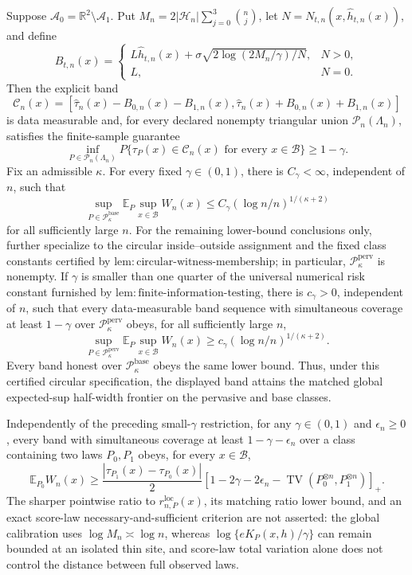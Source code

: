 Suppose \(\mathcal A_0=\mathbb R^2\setminus\mathcal A_1\). Put \(M_n=2|\mathcal H_n|\sum_{j=0}^3\binom nj\), let \(N=N_{t,n}(x,\widehat h_{t,n}(x))\), and define
\[
 B_{t,n}(x)=
 \begin{cases}
 L\widehat h_{t,n}(x)+\sigma\sqrt{2\log(2M_n/\gamma)/N},&N>0,\\
 L,&N=0.
 \end{cases}
\]
Then the explicit band
\[
 \mathcal C_n(x)=
 \left[\widehat\tau_n(x)-B_{0,n}(x)-B_{1,n}(x),
 \widehat\tau_n(x)+B_{0,n}(x)+B_{1,n}(x)\right]
\]
is data measurable and, for every declared nonempty triangular union \(\mathcal P_n(\Lambda_n)\), satisfies the finite-sample guarantee
\[
 \inf_{P\in\mathcal P_n(\Lambda_n)}P\{\tau_P(x)\in\mathcal C_n(x)\text{ for every }x\in\mathcal B\}\ge1-\gamma.
\]
Fix an admissible \(\kappa\).  For every fixed \(\gamma\in(0,1)\), there is \(C_\gamma<\infty\), independent of \(n\), such that
\[
 \sup_{P\in\mathcal P_{\kappa}^{\mathrm{base}}}
 \mathbb E_P\sup_{x\in\mathcal B}W_n(x)
 \le C_\gamma(\log n/n)^{1/(\kappa+2)}
\]
for all sufficiently large \(n\). For the remaining lower-bound conclusions only, further specialize to the circular inside--outside assignment and the fixed class constants certified by \(\mathrm{lem:circular\text{-}witness\text{-}membership}\); in particular, \(\mathcal P_{\kappa}^{\mathrm{perv}}\) is nonempty. If \(\gamma\) is smaller than one quarter of the universal numerical risk constant furnished by \(\mathrm{lem:finite\text{-}information\text{-}testing}\), there is \(c_\gamma>0\), independent of \(n\), such that every data-measurable band sequence with simultaneous coverage at least \(1-\gamma\) over \(\mathcal P_{\kappa}^{\mathrm{perv}}\) obeys, for all sufficiently large \(n\),
\[
 \sup_{P\in\mathcal P_{\kappa}^{\mathrm{perv}}}
 \mathbb E_P\sup_{x\in\mathcal B}W_n(x)
 \ge c_\gamma(\log n/n)^{1/(\kappa+2)}.
\]
Every band honest over \(\mathcal P_{\kappa}^{\mathrm{base}}\) obeys the same lower bound. Thus, under this certified circular specification, the displayed band attains the matched global expected-sup half-width frontier on the pervasive and base classes.

Independently of the preceding small-\(\gamma\) restriction, for any \(\gamma\in(0,1)\) and \(\epsilon_n\ge0\), every band with simultaneous coverage at least \(1-\gamma-\epsilon_n\) over a class containing two laws \(P_0,P_1\) obeys, for every \(x\in\mathcal B\),
\[
 \mathbb E_{P_0}W_n(x)\ge\frac{|\tau_{P_1}(x)-\tau_{P_0}(x)|}{2}
 \left[1-2\gamma-2\epsilon_n-
 \operatorname{TV}(P_0^{\otimes n},P_1^{\otimes n})\right]_+.
\]
The sharper pointwise ratio to \(r_{n,P}^{\mathrm{loc}}(x)\), its matching ratio lower bound, and an exact score-law necessary-and-sufficient criterion are not asserted: the global calibration uses \(\log M_n\asymp\log n\), whereas \(\log\{eK_P(x,h)/\gamma\}\) can remain bounded at an isolated thin site, and score-law total variation alone does not control the distance between full observed laws.
